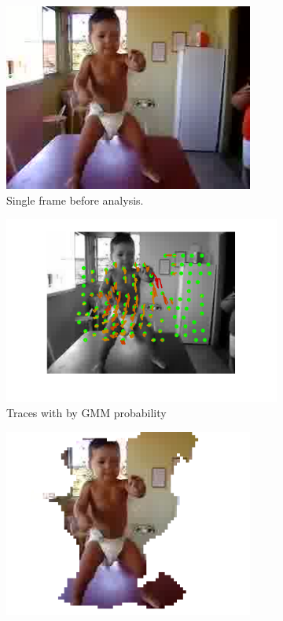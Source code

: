 \begin{figure}[tb]
	\centering
	\begin{subfigure}[b]{0.33\textwidth}
		\centering
		\includegraphics[width=0.9\textwidth]{figs/bimbodance-image50.jpg}
		\caption{Single frame before analysis.}
	\end{subfigure}%
	\begin{subfigure}[b]{0.33\textwidth}
		\centering
		\includegraphics[width=1.2\textwidth]{figs/bimbodance-50.pdf}
		\caption{Traces with by GMM probability}
	\end{subfigure}%
	\begin{subfigure}[b]{0.33\textwidth}
		\centering
		\includegraphics[width=0.9\textwidth]{figs/bimbodance-image50.png}

\end{subfigure}
\end{figure}
